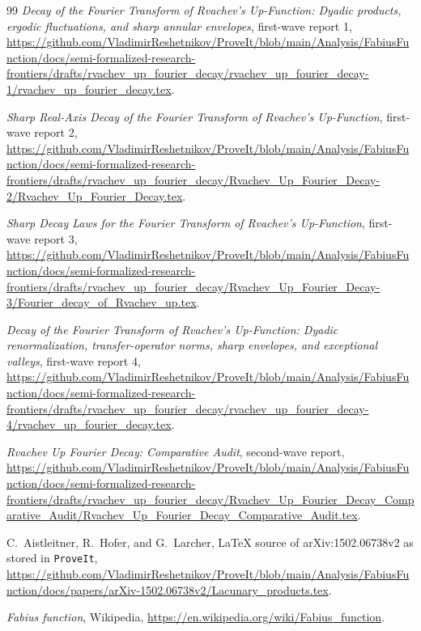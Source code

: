 \documentclass[11pt]{article}
\theoremstyle{definition}
\theoremstyle{remark}
\begin{document}
\begin{thebibliography}{99}
\emph{Decay of the Fourier Transform of Rvachev's Up-Function: Dyadic products,
ergodic fluctuations, and sharp annular envelopes}, first-wave report 1,
\url{https://github.com/VladimirReshetnikov/ProveIt/blob/main/Analysis/FabiusFunction/docs/semi-formalized-research-frontiers/drafts/rvachev_up_fourier_decay/rvachev_up_fourier_decay-1/rvachev_up_fourier_decay.tex}.

\emph{Sharp Real-Axis Decay of the Fourier Transform of Rvachev's Up-Function},
first-wave report 2,
\url{https://github.com/VladimirReshetnikov/ProveIt/blob/main/Analysis/FabiusFunction/docs/semi-formalized-research-frontiers/drafts/rvachev_up_fourier_decay/Rvachev_Up_Fourier_Decay-2/Rvachev_Up_Fourier_Decay.tex}.

\emph{Sharp Decay Laws for the Fourier Transform of Rvachev's Up-Function},
first-wave report 3,
\url{https://github.com/VladimirReshetnikov/ProveIt/blob/main/Analysis/FabiusFunction/docs/semi-formalized-research-frontiers/drafts/rvachev_up_fourier_decay/Rvachev_Up_Fourier_Decay-3/Fourier_decay_of_Rvachev_up.tex}.

\emph{Decay of the Fourier Transform of Rvachev's Up-Function: Dyadic
renormalization, transfer-operator norms, sharp envelopes, and exceptional valleys},
first-wave report 4,
\url{https://github.com/VladimirReshetnikov/ProveIt/blob/main/Analysis/FabiusFunction/docs/semi-formalized-research-frontiers/drafts/rvachev_up_fourier_decay/rvachev_up_fourier_decay-4/rvachev_up_fourier_decay.tex}.

\emph{Rvachev Up Fourier Decay: Comparative Audit}, second-wave report,
\url{https://github.com/VladimirReshetnikov/ProveIt/blob/main/Analysis/FabiusFunction/docs/semi-formalized-research-frontiers/drafts/rvachev_up_fourier_decay/Rvachev_Up_Fourier_Decay_Comparative_Audit/Rvachev_Up_Fourier_Decay_Comparative_Audit.tex}.

C.~Aistleitner, R.~Hofer, and G.~Larcher,
LaTeX source of arXiv:1502.06738v2 as stored in \texttt{ProveIt},
\url{https://github.com/VladimirReshetnikov/ProveIt/blob/main/Analysis/FabiusFunction/docs/papers/arXiv-1502.06738v2/Lacunary_products.tex}.

\emph{Fabius function}, Wikipedia,
\url{https://en.wikipedia.org/wiki/Fabius_function}.

\end{thebibliography}
\end{document}
